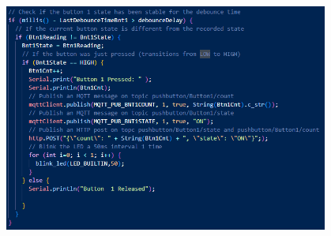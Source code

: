   \begin{center}
  \includegraphics[width=0.80\textwidth]{figs/button1_pressed.png}
  \end{center}

